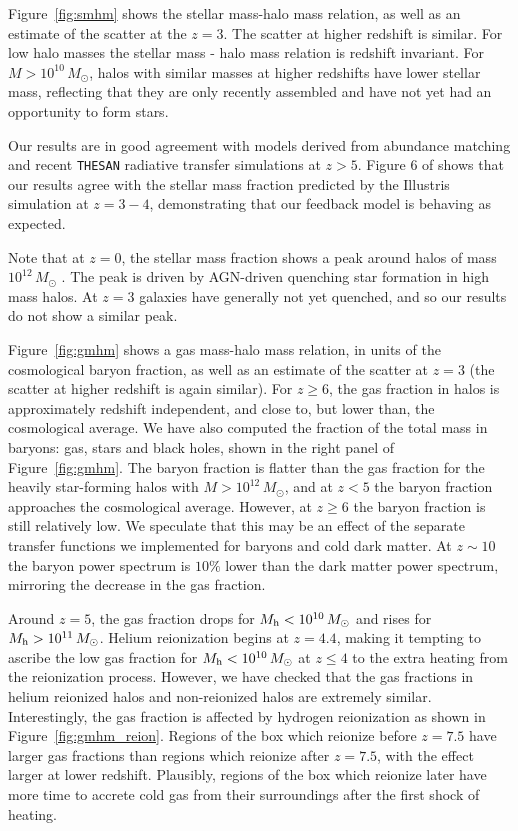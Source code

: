 \documentclass[fleqn,usenatbib]{mnras}
\def\msun{\, M_{\odot}}
\begin{document}
Figure~\ref{fig:smhm} shows the stellar mass-halo mass relation, as well as an estimate of the scatter at the $z=3$. The scatter at higher redshift is similar. For low halo masses the stellar mass - halo mass relation is redshift invariant. For $M > 10^{10} \msun$, halos with similar masses at higher redshifts have lower stellar mass, reflecting that they are only recently assembled and have not yet had an opportunity to form stars. 

Our results are in good agreement with models derived from abundance matching \citep{2019MNRAS.488.3143B} and recent \texttt{THESAN} radiative transfer simulations \citep{2021arXiv211000584K} at $z > 5$. Figure 6 of \cite{2014MNRAS.445..175G} shows that our results agree with the stellar mass fraction predicted by the Illustris simulation at $z = 3-4$, demonstrating that our feedback model is behaving as expected.

Note that at $z=0$, the stellar mass fraction shows a peak around halos of mass $10^{12} \msun$ \cite[e.g.][Figure 11]{2018MNRAS.475..648P}. The peak is driven by AGN-driven quenching star formation in high mass halos. At $z=3$ galaxies have generally not yet quenched, and so our results do not show a similar peak.

Figure~\ref{fig:gmhm} shows a gas mass-halo mass relation, in units of the cosmological baryon fraction, as well as an estimate of the scatter at $z=3$ (the scatter at higher redshift is again similar). For $z \geq 6$, the gas fraction in halos is approximately redshift independent, and close to, but lower than, the cosmological average. We have also computed the fraction of the total mass in baryons: gas, stars and black holes, shown in the right panel of Figure~\ref{fig:gmhm}. The baryon fraction is flatter than the gas fraction for the heavily star-forming halos with $M> 10^{12}\msun$, and at $z < 5$ the baryon fraction approaches the cosmological average. However, at $z \geq 6$ the baryon fraction is still relatively low. We speculate that this may be an effect of the separate transfer functions we implemented for baryons and cold dark matter. At $z \sim 10$ the baryon power spectrum is $10\%$ lower than the dark matter power spectrum, mirroring the decrease in the gas fraction.

Around $z=5$, the gas fraction drops for $M_{\rm h} < 10^{10} \msun$ and rises for $M_{\rm h} > 10^{11} \msun$. Helium reionization begins at $z=4.4$, making it tempting to ascribe the low gas fraction for $M_{\rm h} < 10^{10} \msun$ at $z \leq 4$ to the extra heating from the reionization process. However, we have checked that the gas fractions in helium reionized halos and non-reionized halos are extremely similar. Interestingly, the gas fraction is affected by hydrogen reionization as shown in Figure~\ref{fig:gmhm_reion}. Regions of the box which reionize before $z = 7.5$ have larger gas fractions than regions which reionize after $z=7.5$, with the effect larger at lower redshift. Plausibly, regions of the box which reionize later have more time to accrete cold gas from their surroundings after the first shock of heating.
\end{document}
